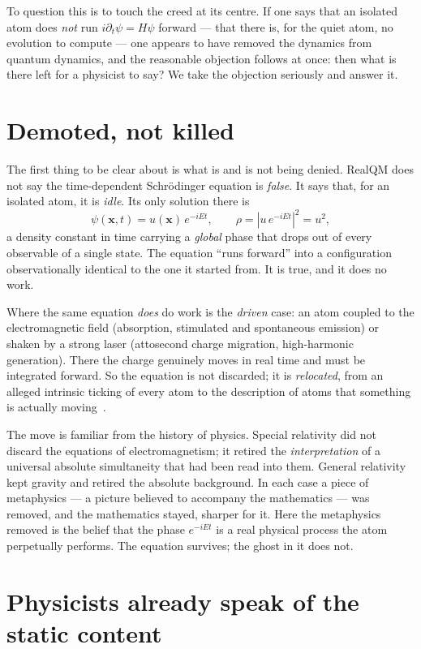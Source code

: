 \documentclass[11pt]{article}
\begin{document}
To question this is to touch the creed at its centre. If one says that an isolated atom does \emph{not} run
$i\partial_t\psi=H\psi$ forward --- that there is, for the quiet atom, no evolution to compute --- one appears
to have removed the dynamics from quantum dynamics, and the reasonable objection follows at once: then what is
there left for a physicist to say? We take the objection seriously and answer it.

\section{Demoted, not killed}

The first thing to be clear about is what is and is not being denied. RealQM does not say the time-dependent
Schr\"odinger equation is \emph{false}. It says that, for an isolated atom, it is \emph{idle}. Its only
solution there is
\[
\psi(\mathbf x,t)=u(\mathbf x)\,e^{-iEt},\qquad \rho=|u\,e^{-iEt}|^2=u^2 ,
\]
a density constant in time carrying a \emph{global} phase that drops out of every observable of a single state.
The equation ``runs forward'' into a configuration observationally identical to the one it started from. It is
true, and it does no work.

Where the same equation \emph{does} do work is the \emph{driven} case: an atom coupled to the electromagnetic
field (absorption, stimulated and spontaneous emission) or shaken by a strong laser (attosecond charge
migration, high-harmonic generation). There the charge genuinely moves in real time and must be integrated
forward. So the equation is not discarded; it is \emph{relocated}, from an alleged intrinsic ticking of every
atom to the description of atoms that something is actually moving~\cite{Time}.

The move is familiar from the history of physics. Special relativity did not discard the equations of
electromagnetism; it retired the \emph{interpretation} of a universal absolute simultaneity that had been read
into them. General relativity kept gravity and retired the absolute background. In each case a piece of
metaphysics --- a picture believed to accompany the mathematics --- was removed, and the mathematics stayed,
sharper for it. Here the metaphysics removed is the belief that the phase $e^{-iEt}$ is a real physical process
the atom perpetually performs. The equation survives; the ghost in it does not.

\section{Physicists already speak of the static content}
\end{document}
